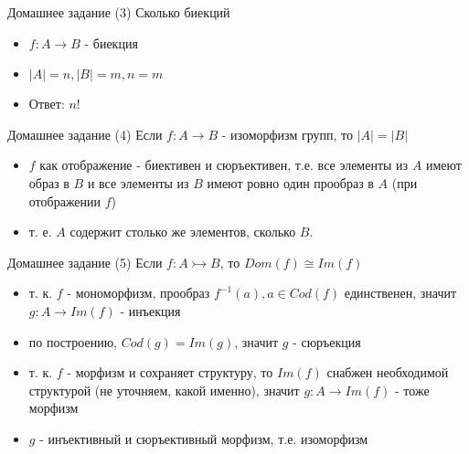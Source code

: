 \documentclass{beamer}
\begin{document}
\begin{frame}{Домашнее задание (3)}
Сколько биекций\\
\bigskip
  \begin{itemize}
    \item $f : A \to B$ - биекция
    \item $\left\vert{A}\right\vert = n, \left\vert{B}\right\vert = m, n = m$
    \item Ответ: $n!$
  \end{itemize}  
\end{frame}

\begin{frame}{Домашнее задание (4)}
Если $f : A \to B$ - изоморфизм групп, то $\left\vert{A}\right\vert = \left\vert{B}\right\vert$\\
\bigskip 
  \begin{itemize}
    \item $f$ как отображение - биективен и сюръективен, т.е. все элементы из $A$ имеют образ в $B$ и все элементы из $B$ имеют ровно один прообраз в $A$ (при отображении $f$)
    \item т. е. $A$ содержит столько же элементов, сколько $B$.
  \end{itemize}  
\end{frame}

\begin{frame}{Домашнее задание (5)}
Если $f : A \rightarrowtail B$, то $Dom(f) \cong Im(f)$\\
\bigskip
  \begin{itemize}
    \item т. к. $f$ - мономорфизм, прообраз $f^{-1}(a), a \in Cod(f)$ единственен, значит $g : A \to Im(f)$ - инъекция
    \item по построению, $Cod(g) = Im(g)$, значит $g$ - сюръекция 
    \item т. к. $f$ - морфизм и сохраняет структуру, то $Im(f)$ снабжен необходимой структурой (не уточняем, какой именно), значит $g : A \to Im(f)$ - тоже морфизм
    \item $g$ - инъективный и сюръективный морфизм, т.е. изоморфизм
  \end{itemize}  
\end{frame}


\end{document}
